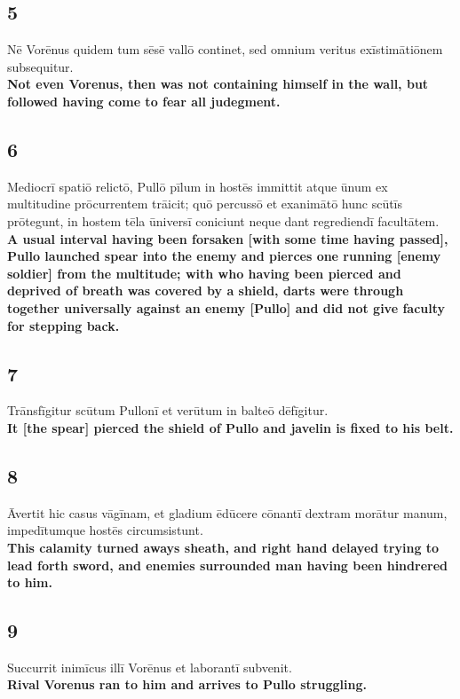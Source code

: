 \documentclass{article}
\begin{document}
\subsection*{5}
Nē Vorēnus quidem tum sēsē vallō continet, sed omnium veritus exīstimātiōnem subsequitur. \\
\textbf{Not even Vorenus, then was not containing himself in the wall, but followed having come to fear all judegment.}

\subsection*{6}
Mediocrī spatiō relictō, Pullō pīlum in hostēs immittit atque ūnum ex multitudine prōcurrentem trāicit; quō percussō et exanimātō hunc scūtīs prōtegunt, in hostem tēla ūniversī coniciunt neque dant regrediendī facultātem. \\
\textbf{A usual interval having been forsaken [with some time having passed], Pullo launched spear into the enemy and pierces one running [enemy soldier] from the multitude; with who having been pierced and deprived of breath was covered by a shield, darts were through together universally against an enemy [Pullo] and did not give faculty for stepping back.}

\subsection*{7}
Trānsfīgitur scūtum Pullonī et verūtum in balteō dēfīgitur.\\
\textbf{It [the spear] pierced the shield of Pullo and javelin is fixed to his belt.} 

\subsection*{8}
Āvertit hic casus vāgīnam, et gladium ēdūcere cōnantī dextram morātur manum, impedītumque hostēs circumsistunt. \\
\textbf{This calamity turned aways sheath, and right hand delayed trying to lead forth sword, and enemies surrounded man having been hindrered to him.}

\subsection*{9}
Succurrit inimīcus illī Vorēnus et laborantī subvenit. \\
\textbf{Rival Vorenus ran to him and arrives to Pullo struggling.}
\end{document}
